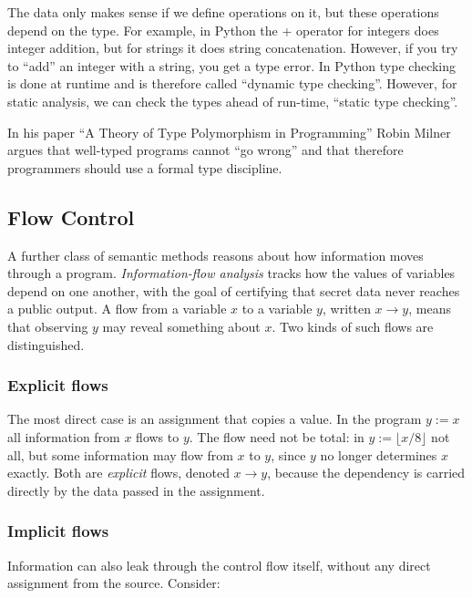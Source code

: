 \documentclass[conference]{IEEEtran}
\begin{document}
The data only makes sense if we define operations on it, but these operations depend on the type. For example, in Python the + operator for integers does integer addition, but for strings it does string concatenation. However, if you try to ``add'' an integer with a string, you get a type error. In Python type checking is done at runtime and is therefore called ``dynamic type checking''. However, for static analysis, we can check the types ahead of run-time, ``static type checking''. \cite{pierce2002tapl, python_datamodel}

In his paper ``A Theory of Type Polymorphism in Programming'' Robin Milner argues that well-typed programs cannot ``go wrong'' and that therefore programmers should use a formal type discipline. \cite{milner1978polymorphism}

\subsection{Flow Control}

A further class of semantic methods reasons about how information moves through a program. \emph{Information-flow analysis} tracks how the values of variables depend on one another, with the goal of certifying that secret data never reaches a public output. \cite{denning1977infoflow, sabelfeld2003infoflow} A flow from a variable $x$ to a variable $y$, written $x \rightarrow y$, means that observing $y$ may reveal something about $x$. Two kinds of such flows are distinguished. \cite{roth2025infoflow}

\subsubsection{\textbf{Explicit flows}} The most direct case is an assignment that copies a value. In the program $y := x$ all information from $x$ flows to $y$. The flow need not be total: in $y := \lfloor x/8 \rfloor$ not all, but some information may flow from $x$ to $y$, since $y$ no longer determines $x$ exactly. Both are \emph{explicit} flows, denoted $x \rightarrow y$, because the dependency is carried directly by the data passed in the assignment.

\subsubsection{\textbf{Implicit flows}} Information can also leak through the control flow itself, without any direct assignment from the source. Consider:
\end{document}
